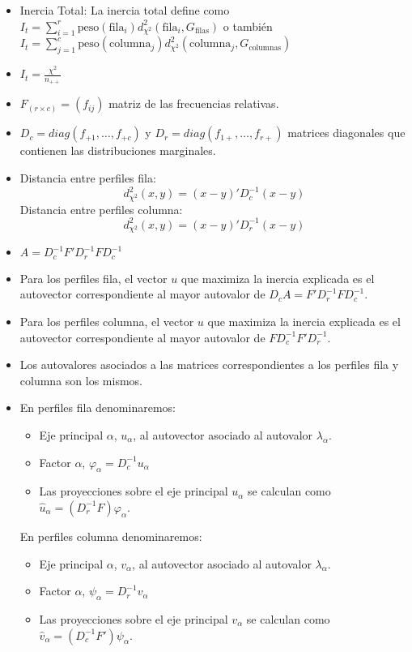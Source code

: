 \documentclass{article}
\begin{document}
\begin{itemize}
    \item Inercia Total: La inercia total define como $I_t=\sum_{i=1}^{r}\text{peso}(\text{fila}_i)d^2_{\chi^2}(\text{fila}_i,G_{\text{filas}})$ o también $I_t=\sum_{j=1}^{c}\text{peso}(\text{columna}_j)d^2_{\chi^2}(\text{columna}_j,G_{\text{columnas}})$
    \item $I_t=\frac{\chi^2}{n_{++}}$
    \item $F_{(r\times c)}=(f_{ij})$ matriz de las frecuencias relativas.
    \item $D_c=diag(f_{+1},\dots,f_{+c})$ y $D_r=diag(f_{1+},\dots,f_{r+})$ matrices diagonales que contienen las distribuciones marginales.
    \item Distancia entre perfiles fila: \[d^2_{\chi^2}(x,y)=(x-y)'D_c^{-1}(x-y)\] Distancia entre perfiles columna: \[d^2_{\chi^2}(x,y)=(x-y)'D_r^{-1}(x-y)\]
    \item $A=D_c^{-1}F'D_r^{-1}FD_c^{-1}$
    \item Para los perfiles fila, el vector $u$ que maximiza la inercia explicada es el autovector correspondiente al mayor autovalor de $D_cA=F'D_r^{-1}FD_c^{-1}$.
    \item Para los perfiles columna, el vector $u$ que maximiza la inercia explicada es el autovector correspondiente al mayor autovalor de $FD_c^{-1}F'D_r^{-1}$.
    \item Los autovalores asociados a las matrices correspondientes a los perfiles fila y columna son los mismos.
    \item En perfiles fila denominaremos:
          \begin{itemize}
              \item Eje principal $\alpha$, $u_\alpha$, al autovector asociado al autovalor $\lambda_\alpha$.
              \item Factor $\alpha$, $\varphi_\alpha=D_c^{-1}u_\alpha$
              \item Las proyecciones sobre el eje principal $u_\alpha$ se calculan como $\hat{u}_\alpha=(D_r^{-1}F)\varphi_\alpha$.
          \end{itemize}
          En perfiles columna denominaremos:
          \begin{itemize}
              \item Eje principal $\alpha$, $v_\alpha$, al autovector asociado al autovalor $\lambda_\alpha$.
              \item Factor $\alpha$, $\psi_\alpha=D_r^{-1}v_\alpha$
              \item Las proyecciones sobre el eje principal $v_\alpha$ se calculan como $\hat{v}_\alpha=(D_c^{-1}F')\psi_\alpha$.

\end{itemize}
\end{itemize}
\end{document}
